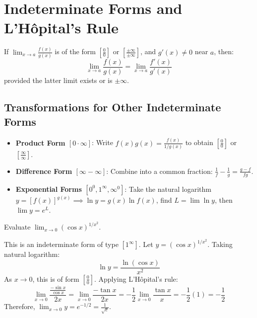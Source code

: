 \section{Indeterminate Forms and L'H\^opital's Rule}

\begin{theorem}
If $\lim_{x\to a} \frac{f(x)}{g(x)}$ is of the form $\left[\frac{0}{0}\right]$ or $\left[\frac{\pm\infty}{\pm\infty}\right]$, and $g'(x) \ne 0$ near $a$, then:
\begin{equation}
\lim_{x\to a} \frac{f(x)}{g(x)} = \lim_{x\to a} \frac{f'(x)}{g'(x)}
\end{equation}
provided the latter limit exists or is $\pm\infty$.
\end{theorem}

\subsection{Transformations for Other Indeterminate Forms}
\begin{itemize}[leftmargin=1.5em]
    \item \textbf{Product Form $[0 \cdot \infty]$}: Write $f(x) g(x) = \frac{f(x)}{1/g(x)}$ to obtain $\left[\frac{0}{0}\right]$ or $\left[\frac{\infty}{\infty}\right]$.
    \item \textbf{Difference Form $[\infty - \infty]$}: Combine into a common fraction: $\frac{1}{f} - \frac{1}{g} = \frac{g - f}{fg}$.
    \item \textbf{Exponential Forms $[0^0, 1^\infty, \infty^0]$}: Take the natural logarithm $y = [f(x)]^{g(x)} \implies \ln y = g(x) \ln f(x)$, find $L = \lim \ln y$, then $\lim y = e^L$.
\end{itemize}

\begin{example}
Evaluate $\lim_{x\to 0} (\cos x)^{1/x^2}$.
\end{example}

\begin{solutionbox}
This is an indeterminate form of type $[1^\infty]$.
Let $y = (\cos x)^{1/x^2}$. Taking natural logarithm:
\begin{equation}
\ln y = \frac{\ln(\cos x)}{x^2}
\end{equation}
As $x \to 0$, this is of form $\left[\frac{0}{0}\right]$. Applying L'H\^opital's rule:
\begin{equation}
\lim_{x\to 0} \frac{\frac{-\sin x}{\cos x}}{2x} = \lim_{x\to 0} \frac{-\tan x}{2x} = -\frac{1}{2} \lim_{x\to 0} \frac{\tan x}{x} = -\frac{1}{2}(1) = -\frac{1}{2}
\end{equation}
Therefore, $\lim_{x\to 0} y = e^{-1/2} = \frac{1}{\sqrt{e}}$.
\end{solutionbox}

